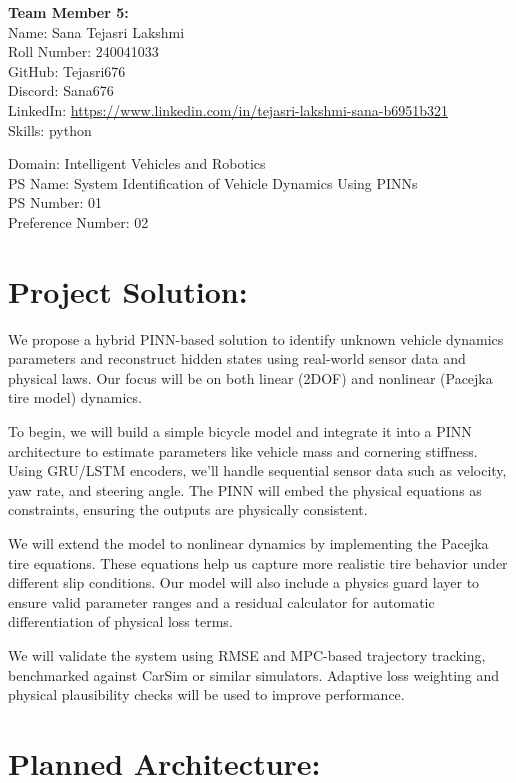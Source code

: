 \documentclass{article}
\begin{document}
\vspace{1em}
\textbf{Team Member 5:} \\
Name: Sana Tejasri Lakshmi \\
Roll Number: 240041033 \\
GitHub: Tejasri676 \\
Discord: Sana676 \\
LinkedIn: \url{https://www.linkedin.com/in/tejasri-lakshmi-sana-b6951b321} \\
Skills: python

\vspace{1em}
Domain: Intelligent Vehicles and Robotics \\
PS Name: System Identification of Vehicle Dynamics Using PINNs\\
PS Number: 01 \\
Preference Number: 02

\section*{Project Solution:}

We propose a hybrid PINN-based solution to identify unknown vehicle dynamics parameters and reconstruct hidden states using real-world sensor data and physical laws. Our focus will be on both linear (2DOF) and nonlinear (Pacejka tire model) dynamics.

To begin, we will build a simple bicycle model and integrate it into a PINN architecture to estimate parameters like vehicle mass and cornering stiffness. Using GRU/LSTM encoders, we'll handle sequential sensor data such as velocity, yaw rate, and steering angle. The PINN will embed the physical equations as constraints, ensuring the outputs are physically consistent.

We will extend the model to nonlinear dynamics by implementing the Pacejka tire equations. These equations help us capture more realistic tire behavior under different slip conditions. Our model will also include a physics guard layer to ensure valid parameter ranges and a residual calculator for automatic differentiation of physical loss terms.

We will validate the system using RMSE and MPC-based trajectory tracking, benchmarked against CarSim or similar simulators. Adaptive loss weighting and physical plausibility checks will be used to improve performance.

\section*{Planned Architecture:}
\end{document}
